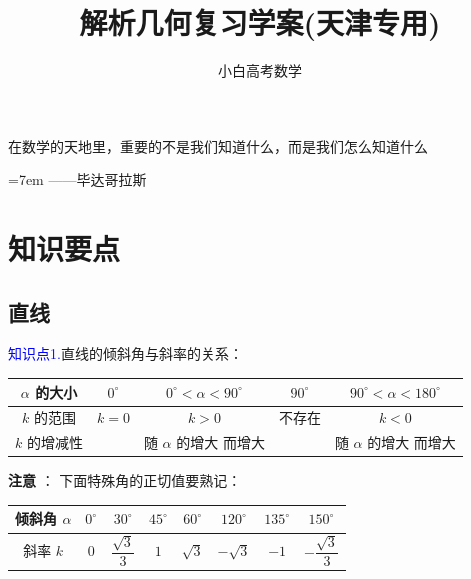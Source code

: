 \documentclass{article}
\title{解析几何复习学案(天津专用)}
\author{小白高考数学}
\date{}
\begin{document}
\maketitle

\vspace{30\baselineskip}
\begin{center}
在数学的天地里，重要的不是我们知道什么，而是我们怎么知道什么
\end{center}
\begin{flushright}
    \rightskip=7em 
——毕达哥拉斯
\end{flushright}    
\newpage
\tableofcontents %
\newpage 

\section{知识要点}

\subsection{直线}

\vspace{1\baselineskip}

\textcolor{blue}{知识点1.}直线的倾斜角与斜率的关系：
\begin{center}
\begin{tabular}{|c|c|c|c|c|}
\hline
$\alpha$ 的大小 & $0^\circ$ & $0^\circ < \alpha < 90^\circ$ & $90^\circ$ & $90^\circ < \alpha < 180^\circ$ \\
\hline
$k$ 的范围 & $k=0$ & $k>0$ & 不存在 & $k<0$ \\
\hline
$k$ 的增减性 & \diagbox{}{} & \makecell{随 $\alpha$ 的增大\\而增大} & \diagbox{}{} & \makecell{随 $\alpha$ 的增大\\而增大} \\
\hline
\end{tabular}
\end{center}

\vspace{1em}

\textbf{注意} ： 下面特殊角的正切值要熟记：

\vspace{1em}

\begin{center}
\begin{tabular}{|c|c|c|c|c|c|c|c|}
\hline
倾斜角 \(\alpha\) & \(0^\circ\) & \(30^\circ\) & \(45^\circ\) & \(60^\circ\) & \(120^\circ\) & \(135^\circ\) & \(150^\circ\) \\
\hline
斜率 \(k\) & \(0\) & \(\dfrac{\sqrt{3}}{3}\) & \(1\) & \(\sqrt{3}\) & \(-\sqrt{3}\) & \(-1\) & \(-\dfrac{\sqrt{3}}{3}\) \\
\hline
\end{tabular}
\end{center}
\vspace{1\baselineskip}
\end{document}
